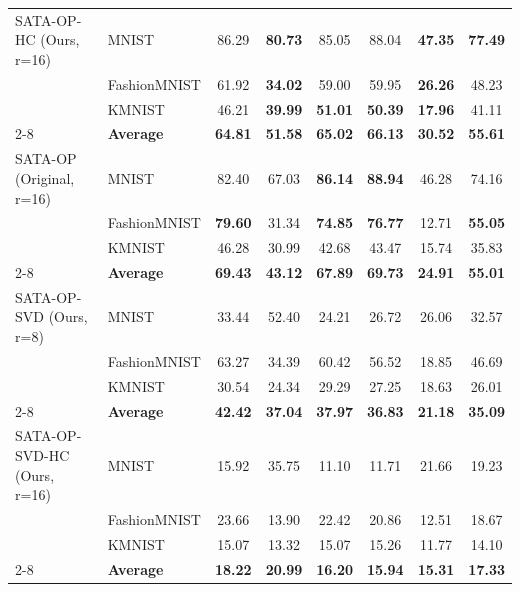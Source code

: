 \documentclass{article}
\theoremstyle{plain}
\theoremstyle{definition}
\theoremstyle{remark}
\begin{document}
\begin{table}[h]
\begin{small}
\begin{sc}
\begin{tabular}{llcccccc}
\midrule
SATA-OP-HC (Ours, r=16) & MNIST & 86.29 & \textbf{80.73} & 85.05 & 88.04 & \textbf{47.35} & \textbf{77.49} \\
& FashionMNIST & 61.92 & \textbf{34.02} & 59.00 & 59.95 & \textbf{26.26} & 48.23 \\
& KMNIST & 46.21 & \textbf{39.99} & \textbf{51.01} & \textbf{50.39} & \textbf{17.96} & 41.11 \\
\cmidrule{2-8}
& \textbf{Average} & \textbf{64.81} & \textbf{51.58} & \textbf{65.02} & \textbf{66.13} & \textbf{30.52} & \textbf{55.61} \\
\midrule
SATA-OP (Original, r=16) & MNIST & 82.40 & 67.03 & \textbf{86.14} & \textbf{88.94} & 46.28 & 74.16 \\
& FashionMNIST & \textbf{79.60} & 31.34 & \textbf{74.85} & \textbf{76.77} & 12.71 & \textbf{55.05} \\
& KMNIST & 46.28 & 30.99 & 42.68 & 43.47 & 15.74 & 35.83 \\
\cmidrule{2-8}
& \textbf{Average} & \textbf{69.43} & \textbf{43.12} & \textbf{67.89} & \textbf{69.73} & \textbf{24.91} & \textbf{55.01} \\
\midrule
SATA-OP-SVD (Ours, r=8) & MNIST & 33.44 & 52.40 & 24.21 & 26.72 & 26.06 & 32.57 \\
& FashionMNIST & 63.27 & 34.39 & 60.42 & 56.52 & 18.85 & 46.69 \\
& KMNIST & 30.54 & 24.34 & 29.29 & 27.25 & 18.63 & 26.01 \\
\cmidrule{2-8}
& \textbf{Average} & \textbf{42.42} & \textbf{37.04} & \textbf{37.97} & \textbf{36.83} & \textbf{21.18} & \textbf{35.09} \\
\midrule
SATA-OP-SVD-HC (Ours, r=16) & MNIST & 15.92 & 35.75 & 11.10 & 11.71 & 21.66 & 19.23 \\
& FashionMNIST & 23.66 & 13.90 & 22.42 & 20.86 & 12.51 & 18.67 \\
& KMNIST & 15.07 & 13.32 & 15.07 & 15.26 & 11.77 & 14.10 \\
\cmidrule{2-8}
& \textbf{Average} & \textbf{18.22} & \textbf{20.99} & \textbf{16.20} & \textbf{15.94} & \textbf{15.31} & \textbf{17.33} \\
\bottomrule
\end{tabular}
\end{sc}
\end{small}
\vskip -0.1in
\end{table}
\end{document}
